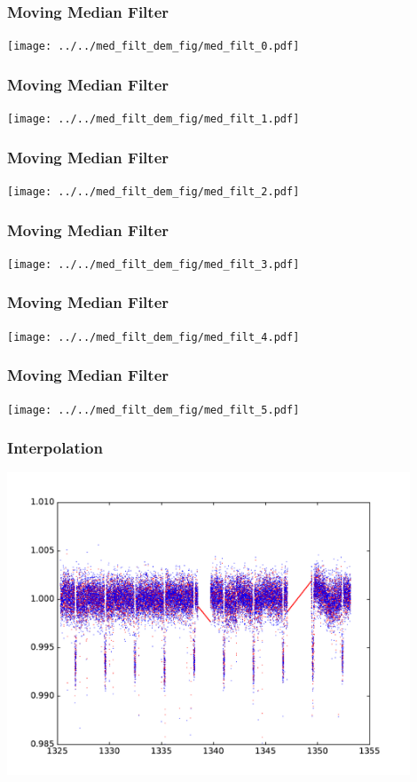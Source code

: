 \documentclass[notes]{beamer}
\begin{document}
\begin{frame}
\frametitle{Moving Median Filter}
\centering
\texttt{[image: ../../med\_filt\_dem\_fig/med\_filt\_0.pdf]}
\end{frame}

\begin{frame}
\frametitle{Moving Median Filter}
\centering
\texttt{[image: ../../med\_filt\_dem\_fig/med\_filt\_1.pdf]}
\end{frame}

\begin{frame}
\frametitle{Moving Median Filter}
\centering
\texttt{[image: ../../med\_filt\_dem\_fig/med\_filt\_2.pdf]}
\end{frame}

\begin{frame}
\frametitle{Moving Median Filter}
\centering
\texttt{[image: ../../med\_filt\_dem\_fig/med\_filt\_3.pdf]}
\end{frame}

\begin{frame}
\frametitle{Moving Median Filter}
\centering
\texttt{[image: ../../med\_filt\_dem\_fig/med\_filt\_4.pdf]}
\end{frame}

\begin{frame}
\frametitle{Moving Median Filter}
\centering
\texttt{[image: ../../med\_filt\_dem\_fig/med\_filt\_5.pdf]}
\end{frame}

\begin{frame}
\frametitle{Interpolation}
\centering
\includegraphics[width=0.9\textwidth]{../figures/2018-11-14_15:35:52_inter_curve0.pdf}
\end{frame}
\end{document}
